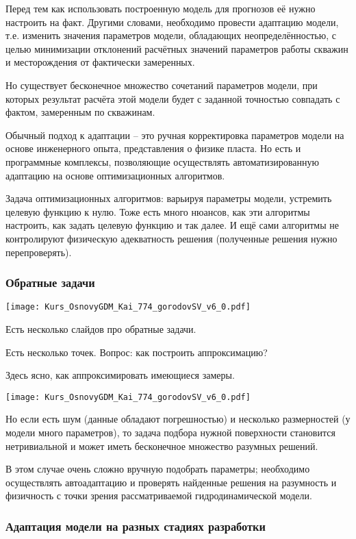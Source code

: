 \documentclass[main.tex]{subfiles}
\begin{document}
Перед тем как использовать построенную модель для прогнозов её нужно настроить на факт.
Другими словами, необходимо провести адаптацию модели, т.е. изменить значения параметров модели, обладающих неопределённостью, с целью минимизации отклонений расчётных значений параметров работы скважин и месторождения от фактически замеренных.

Но существует бесконечное множество сочетаний параметров модели, при которых результат расчёта этой модели будет с заданной точностью совпадать с фактом, замеренным по скважинам.

Обычный подход к адаптации -- это ручная корректировка параметров модели на основе инженерного опыта, представления о физике пласта. Но есть и программные комплексы, позволяющие осуществлять автоматизированную адаптацию на основе оптимизационных алгоритмов.

Задача оптимизационных алгоритмов: варьируя параметры модели, устремить целевую функцию к нулю.
Тоже есть много нюансов, как эти алгоритмы настроить, как задать целевую функцию и так далее.
И ещё сами алгоритмы не контролируют физическую адекватность решения (полученные решения нужно перепроверять).

\subsubsection{Обратные задачи}

\texttt{[image: Kurs\_OsnovyGDM\_Kai\_774\_gorodovSV\_v6\_0.pdf]}

Есть несколько слайдов про обратные задачи.

Есть несколько точек. Вопрос: как построить аппроксимацию?

Здесь ясно, как аппроксимировать имеющиеся замеры.

\texttt{[image: Kurs\_OsnovyGDM\_Kai\_774\_gorodovSV\_v6\_0.pdf]}

Но если есть шум (данные обладают погрешностью) и несколько размерностей (у модели много параметров), то задача подбора нужной поверхности становится нетривиальной и может иметь бесконечное множество разумных решений.

В этом случае очень сложно вручную подобрать параметры; необходимо осуществлять автоадаптацию и проверять найденные решения на разумность и физичность с точки зрения рассматриваемой гидродинамической модели.

\subsubsection{Адаптация модели на разных стадиях разработки}
\end{document}
